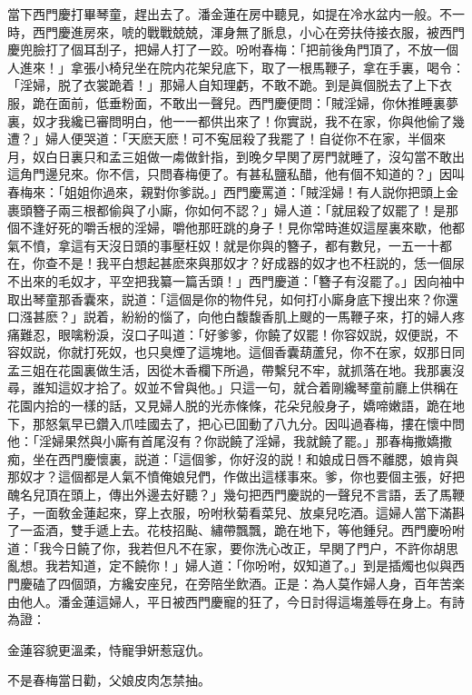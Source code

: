 當下西門慶打畢琴童，趕出去了。潘金蓮在房中聽見，如提在冷水盆内一般。不一時，西門慶進房來，唬的戰戰兢兢，渾身無了脈息，小心在旁扶侍接衣服，被西門慶兜臉打了個耳刮子，把婦人打了一跤。吩咐春梅：「把前後角門頂了，不放一個人進來！」拿張小椅兒坐在院内花架兒底下，取了一根馬鞭子，拿在手裏，喝令：「淫婦，脱了衣裳跪着！」那婦人自知理虧，不敢不跪。到是眞個脱去了上下衣服，跪在面前，低垂粉面，不敢出一聲兒。西門慶便問：「賊淫婦，你休推睡裏夢裏，奴才我纔已審問明白，他一一都供出來了！你實説，我不在家，你與他偷了幾遭？」婦人便哭道：「天麽天麽！可不寃屈殺了我罷了！自従你不在家，半個來月，奴白日裏只和孟三姐做一䖏做針指，到晚夕早関了房門就睡了，沒勾當不敢出這角門邊兒來。你不信，只問春梅便了。有甚私鹽私醋，他有個不知道的？」因叫春梅來：「姐姐你過來，親對你爹説。」西門慶罵道：「賊淫婦！有人説你把頭上金裹頭簪子兩三根都偷與了小廝，你如何不認？」婦人道：「就屈殺了奴罷了！是那個不逢好死的嚼舌根的淫婦，嚼他那旺跳的身子！見你常時進奴這屋裏來歇，他都氣不憤，拿這有天沒日頭的事壓枉奴！就是你與的簪子，都有數兒，一五一十都在，你查不是！我平白想起甚麽來與那奴才？好成器的奴才也不枉説的，恁一個尿不出來的毛奴才，平空把我纂一篇舌頭！」西門慶道：「簪子有沒罷了。」因向袖中取出琴童那香囊來，説道：「這個是你的物件兒，如何打小廝身底下搜出來？你還口漒甚麽？」説着，紛紛的惱了，向他白馥馥香肌上颼的一馬鞭子來，打的婦人疼痛難忍，眼噙粉淚，沒口子叫道：「好爹爹，你饒了奴罷！你容奴説，奴便説，不容奴説，你就打死奴，也只臭煙了這塊地。這個香囊葫蘆兒，你不在家，奴那日同孟三姐在花園裏做生活，因從木香欄下所過，帶繫兒不牢，就抓落在地。我那裏沒尋，誰知這奴才拾了。奴並不曾與他。」只這一句，就合着剛纔琴童前廳上供稱在花園内拾的一樣的話，又見婦人脱的光赤條條，花朵兒般身子，嬌啼嫩語，跪在地下，那怒氣早已鑽入爪哇國去了，把心已囬動了八九分。因叫過春梅，摟在懷中問他：「淫婦果然與小廝有首尾沒有？你説饒了淫婦，我就饒了罷。」那春梅撒嬌撒痴，坐在西門慶懷裏，説道：「這個爹，你好沒的説！和娘成日唇不離腮，娘肯與那奴才？這個都是人氣不憤俺娘兒們，作做出這樣事來。爹，你也要個主張，好把醜名兒頂在頭上，傳出外邊去好聽？」幾句把西門慶説的一聲兒不言語，丢了馬鞭子，一面敎金蓮起來，穿上衣服，吩咐秋菊看菜兒、放桌兒吃酒。這婦人當下滿斟了一盃酒，雙手遞上去。花枝招颭、繡帶飄飄，跪在地下，等他鍾兒。西門慶吩咐道：「我今日饒了你，我若但凡不在家，要你洗心改正，早関了門户，不許你胡思亂想。我若知道，定不饒你！」婦人道：「你吩咐，奴知道了。」到是插燭也似與西門慶磕了四個頭，方纔安座兒，在旁陪坐飲酒。正是：為人莫作婦人身，百年苦楽由他人。潘金蓮這婦人，平日被西門慶寵的狂了，今日討得這塲羞辱在身上。有詩為證：

金蓮容貌更溫柔，恃寵爭姸惹寇仇。

不是春梅當日勸，父娘皮肉怎禁抽。

